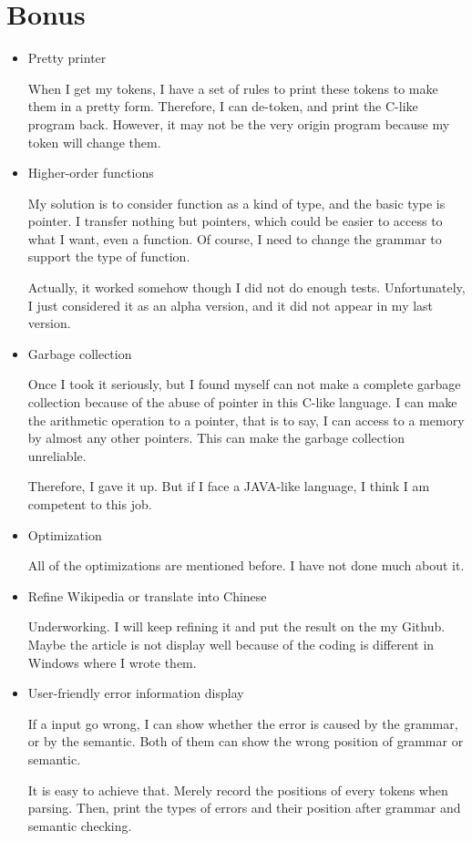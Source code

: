 \documentclass[preprint, 9pt]{sigplanconf}
\begin{document}
\section{Bonus}
    \begin{itemize}
        \item{Pretty printer}

            When I get my tokens, I have a set of rules to print these tokens to make them in a pretty form.
            Therefore, I can de-token, and print the C-like program back. However, it may not be the very origin program because my token will change them.
        \item{Higher-order functions}

            My solution is to consider function as a kind of type, and the basic type is pointer.
            I transfer nothing but pointers, which could be easier to access to what I want, even a function.
            Of course, I need to change the grammar to support the type of function.

            Actually, it worked somehow though I did not do enough tests.
            Unfortunately, I just considered it as an alpha version, and it did not appear in my last version.

        \item{Garbage collection}

            Once I took it seriously, but I found myself can not make a complete garbage collection because of the abuse of pointer in this C-like language.
            I can make the arithmetic operation to a pointer, that is to say, I can access to a memory by almost any other pointers.
            This can make the garbage collection unreliable.

            Therefore, I gave it up.
            But if I face a JAVA-like language, I think I am competent to this job.

        \item{Optimization}

            All of the optimizations are mentioned before.
            I have not done much about it.

        \item{Refine Wikipedia or translate into Chinese}

            Underworking.
            I will keep refining it and put the result on the my Github.
            Maybe the article is not display well because of the coding is different in Windows where I wrote them.

        \item{User-friendly error information display}

            If a input go wrong, I can show whether the error is caused by the grammar, or by the semantic.
            Both of them can show the wrong position of grammar or semantic.

            It is easy to achieve that.
            Merely record the positions of every tokens when parsing.
            Then, print the types of errors and their position after grammar and semantic checking.

    \end{itemize}
\end{document}

